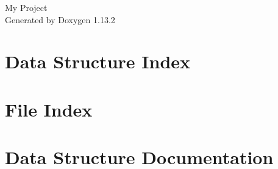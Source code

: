 \documentclass[twoside]{book}
\newcommand{\+}{\discretionary{\mbox{\scriptsize$\hookleftarrow$}}{}{}}
\newcommand{\clearemptydoublepage}{%
    \newpage{\pagestyle{empty}\cleardoublepage}%
  }
\begin{document}
  \raggedbottom
    \hypersetup{pageanchor=false,
                bookmarksnumbered=true,
                pdfencoding=unicode
               }
  \begin{titlepage}
  \vspace*{7cm}
  \begin{center}%
  {\Large My Project}\\
  \vspace*{1cm}
  {\large Generated by Doxygen 1.13.2}\\
  \end{center}
  \end{titlepage}
  \clearemptydoublepage
  \tableofcontents
  \clearemptydoublepage
  \hypersetup{pageanchor=true}
\chapter{Data Structure Index}

\chapter{File Index}

\chapter{Data Structure Documentation}



















\end{document}
